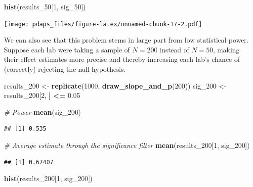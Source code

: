 \documentclass[12pt,oneside,openany]{book}
\newenvironment{Shaded}{\begin{snugshade}}{\end{snugshade}}
\newcommand{\KeywordTok}[1]{\textcolor[rgb]{0.13,0.29,0.53}{\textbf{#1}}}
\newcommand{\DecValTok}[1]{\textcolor[rgb]{0.00,0.00,0.81}{#1}}
\newcommand{\FloatTok}[1]{\textcolor[rgb]{0.00,0.00,0.81}{#1}}
\newcommand{\StringTok}[1]{\textcolor[rgb]{0.31,0.60,0.02}{#1}}
\newcommand{\CommentTok}[1]{\textcolor[rgb]{0.56,0.35,0.01}{\textit{#1}}}
\newcommand{\OperatorTok}[1]{\textcolor[rgb]{0.81,0.36,0.00}{\textbf{#1}}}
\newcommand{\NormalTok}[1]{#1}
\begin{document}
\begin{Shaded}
\begin{Highlighting}[]
\KeywordTok{hist}\NormalTok{(results_}\DecValTok{50}\NormalTok{[}\DecValTok{1}\NormalTok{, sig_}\DecValTok{50}\NormalTok{])}
\end{Highlighting}
\end{Shaded}

\texttt{[image: pdaps\_files/figure-latex/unnamed-chunk-17-2.pdf]}

We can also see that this problem stems in large part from low
statistical power. Suppose each lab were taking a sample of \(N = 200\)
instead of \(N = 50\), making their effect estimates more precise and
thereby increasing each lab's chance of (correctly) rejecting the null
hypothesis.

\begin{Shaded}
\begin{Highlighting}[]
\NormalTok{results_}\DecValTok{200}\NormalTok{ <-}\StringTok{ }\KeywordTok{replicate}\NormalTok{(}\DecValTok{1000}\NormalTok{, }\KeywordTok{draw_slope_and_p}\NormalTok{(}\DecValTok{200}\NormalTok{))}
\NormalTok{sig_}\DecValTok{200}\NormalTok{ <-}\StringTok{ }\NormalTok{results_}\DecValTok{200}\NormalTok{[}\DecValTok{2}\NormalTok{, ] }\OperatorTok{<=}\StringTok{ }\FloatTok{0.05}

\CommentTok{# Power}
\KeywordTok{mean}\NormalTok{(sig_}\DecValTok{200}\NormalTok{)}
\end{Highlighting}
\end{Shaded}

\begin{verbatim}
## [1] 0.535
\end{verbatim}

\begin{Shaded}
\begin{Highlighting}[]
\CommentTok{# Average estimate through the significance filter}
\KeywordTok{mean}\NormalTok{(results_}\DecValTok{200}\NormalTok{[}\DecValTok{1}\NormalTok{, sig_}\DecValTok{200}\NormalTok{])}
\end{Highlighting}
\end{Shaded}

\begin{verbatim}
## [1] 0.67407
\end{verbatim}

\begin{Shaded}
\begin{Highlighting}[]
\KeywordTok{hist}\NormalTok{(results_}\DecValTok{200}\NormalTok{[}\DecValTok{1}\NormalTok{, sig_}\DecValTok{200}\NormalTok{])}
\end{Highlighting}
\end{Shaded}
\end{document}
